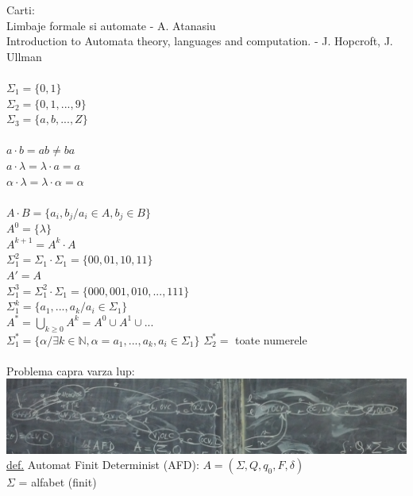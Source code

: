\documentclass[12pt]{extarticle}
\begin{document}
	{\large
		Carti: \\
		Limbaje formale si automate - A. Atanasiu \\
		Introduction to Automata theory, languages and computation. - J. Hopcroft, J. Ullman \\
		\\
		$\Sigma_{1} = \{ 0, 1 \}$ \\
		$\Sigma_{2} = \{ 0, 1, ..., 9 \}$ \\
		$\Sigma_{3} = \{ a, b, ..., Z \}$ \\
		\\
		$a \cdot b = ab \neq ba$ \\
		$a \cdot \lambda = \lambda \cdot a = a$ \\
		$\alpha \cdot \lambda = \lambda \cdot \alpha = \alpha$ \\
		\\
		$A \cdot B = \{ a_{i}, b_{j} / a_{i} \in A, b_{j} \in B \}$ \\
		$A^{0} = \{ \lambda \}$ \\
		$A^{k+1} = A^{k} \cdot A$ \\
		$\Sigma_{1}^{2} = \Sigma_{1} \cdot \Sigma_{1} = \{ 00, 01, 10, 11 \}$ \\
		$A' = A$ \\
		$\Sigma_{1}^{3} = \Sigma_{1}^{2} \cdot \Sigma_{1} = \{ 000, 001, 010, ..., 111 \}$ \\
		$\Sigma_{1}^{k} = \{ a_{1}, ..., a_{k} / a_{i} \in \Sigma_{1} \}$ \\
		$A^{*} = \underset{k \geq 0}{\bigcup}A^{k} = A^{0} \cup A^{1} \cup ...$ \\
		$\Sigma_{1}^{*} = \{ \alpha / \exists k \in \mathbb{N}, \alpha = a_{1}, ..., a_{k}, a_{i} \in \Sigma_{1} \}$
		$\Sigma_{2}^{*} =$ toate numerele \\
		\\
		Problema capra varza lup: \\
		\includegraphics[width=\textwidth]{figura1.png} \\
		\underline{def.} Automat Finit Determinist (AFD): $A = (\Sigma, Q, q_{0}, F, \delta)$ \\
		$\Sigma$ = alfabet (finit) \\
}
\end{document}
